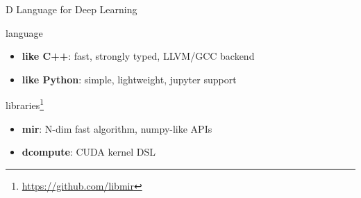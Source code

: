 \documentclass[aspectratio=169,
  14pt,xcolor=dvipsnames,table,professional font,dvipdfmx]{beamer}
\begin{document}
\maketitle




\begin{frame}{\alert{D L}anguage for \alert{D}eep \alert{L}earning}
  \begin{alertblock}{language}
    \begin{itemize}
    \item \textbf{like C++}: fast, strongly typed, LLVM/GCC backend
    \item \textbf{like Python}: simple, lightweight, jupyter support
    \end{itemize}
  \end{alertblock}
  \begin{exampleblock}{libraries\footnote{\url{https://github.com/libmir}}}
    \begin{itemize}
    \item \textbf{mir}: N-dim fast algorithm, numpy-like APIs
    \item \textbf{dcompute}: CUDA kernel DSL
    \end{itemize}
  \end{exampleblock}
\end{frame}
\end{document}
